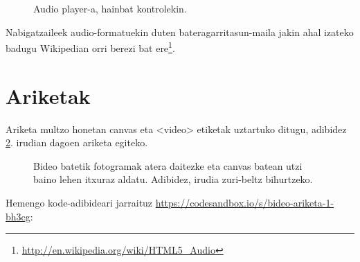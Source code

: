 \begin{figure}[ht]
	\centering
{}
\caption{Audio player-a, hainbat kontrolekin.}
\label{fig:audiocontrols}
\end{figure}


Nabigatzaileek audio-formatuekin duten bateragarritasun-maila jakin ahal izateko badugu Wikipedian orri berezi bat ere\footnote{\href{http://en.wikipedia.org/wiki/HTML5\_Audio}{http://en.wikipedia.org/wiki/HTML5\_Audio}}.

\section{Ariketak}

Ariketa multzo honetan canvas eta <video> etiketak uztartuko ditugu, adibidez \ref{fig:bideoariketa}. irudian dagoen ariketa egiteko. 

\begin{figure}[ht]
	\centering
{}
\caption{Bideo batetik fotogramak atera daitezke eta canvas batean utzi baino lehen itxuraz aldatu. Adibidez, irudia zuri-beltz bihurtzeko.}
\label{fig:bideoariketa}
\end{figure}

Hemengo kode-adibideari jarraituz
\href{https://codesandbox.io/s/bideo-ariketa-1-bh3cg}{https://codesandbox.io/s/bideo-ariketa-1-bh3cg}:

